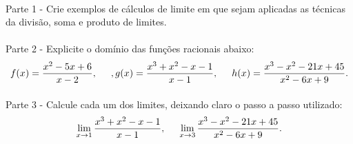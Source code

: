 \documentclass{article}
\begin{document}
\paragraph{} Parte 1 - Crie exemplos de c\'alculos de limite em que sejam aplicadas as t\'ecnicas da divis\~ao, soma e produto de limites. 
\paragraph{} Parte 2 - Explicite o dom\'inio das fun\c c\~oes racionais abaixo:
$$
	f(x) = \frac{x^2 - 5x + 6}{x - 2}, \hspace{0.5cm}, g(x) = \frac{x^3 + x^2 - x - 1}{x - 1}, \hspace{0.5cm} h(x) = \frac{x^3 - x^2 - 21x + 45}{x^2 - 6x + 9}.
$$
\paragraph{} Parte 3 - Calcule cada um dos limites, deixando claro o passo a passo utilizado: 
$$
\lim_{x\to1} \frac{x^3 + x^2 - x - 1}{x - 1}, \hspace{0.5cm} \lim_{x\to3}\frac{x^3 - x^2 - 21x + 45}{x^2 - 6x + 9}.
$$
\newpage
\end{document}
